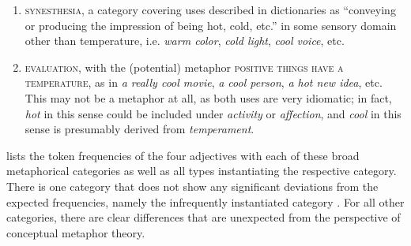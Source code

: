 \begin{enumerate}
\item \textsc{synesthesia}, a category covering uses described in dictionaries  as ``conveying or producing the impression of being hot, cold, etc.'' in some sensory domain other than temperature, i.e. \textit{warm color}, \textit{cold light}, \textit{cool voice}, etc.

\item \textsc{evaluation}, with the (potential) metaphor \textsc{positive things have a temperature}, as in \textit{a really cool movie}, \textit{a cool person}, \textit{a hot new idea}, etc. This may not be a metaphor  at all, as both uses are very idiomatic;  in fact, \textit{hot} in this sense could be included under \textit{activity} or \textit{affection}, and \textit{cool} in this sense is presumably derived from \textit{temperament}.

\end{enumerate}

 lists the token  frequencies  of the four adjectives  with each of these broad metaphorical  categories as well as all types  instantiating the respective category. There is one category that does not show any significant deviations from the expected  frequencies, namely the infrequently instantiated category . For all other categories, there are clear differences that are unexpected from the perspective of conceptual  metaphor theory.

